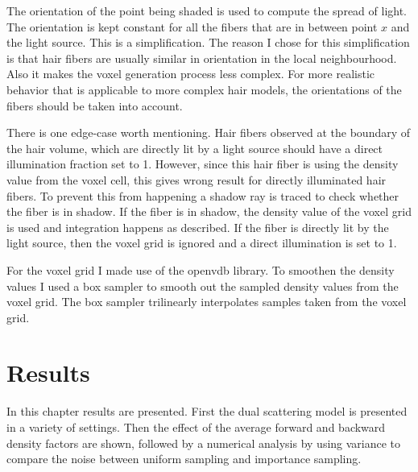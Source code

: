 \documentclass[11pt,a4paper]{report}
\begin{document}
The orientation of the point being shaded is used to compute the spread of light. The orientation is kept constant for all the fibers that are in between point $x$ and the light source. This is a simplification. The reason I chose for this simplification is that hair fibers are usually similar in orientation in the local neighbourhood. Also it makes the voxel generation process less complex. For more realistic behavior that is applicable to more complex hair models, the orientations of the fibers should be taken into account.

There is one edge-case worth mentioning. Hair fibers observed at the boundary of the hair volume, which are directly lit by a light source should have a direct illumination fraction set to 1. However, since this hair fiber is using the density value from the voxel cell, this gives wrong result for directly illuminated hair fibers. To prevent this from happening a shadow ray is traced to check whether the fiber is in shadow. If the fiber is in shadow, the density value of the voxel grid is used and integration happens as described. If the fiber is directly lit by the light source, then the voxel grid is ignored and a direct illumination is set to 1.

For the voxel grid I made use of the openvdb library. To smoothen the density values I used a box sampler to smooth out the sampled density values from the voxel grid. The box sampler trilinearly interpolates samples taken from the voxel grid.


\chapter{Results}

In this chapter results are presented. First the dual scattering model is presented in a variety of settings. Then the effect of the average forward and backward density factors are shown, followed by a numerical analysis by using variance to compare the noise between uniform sampling and importance sampling.



%
%
\end{document}
